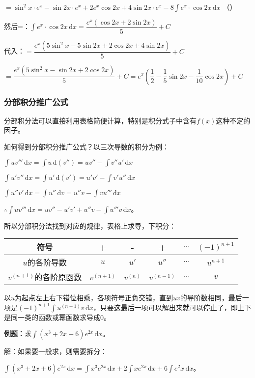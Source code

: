 \documentclass[UTF8, 12pt]{ctexart}
\begin{document}
$=\sin^2x\cdot e^x-\sin2x\cdot e^x+2e^x\cos2x+4\sin2x\cdot e^x-8\int e^x\cdot\cos2x\,\textrm{d}x$ （）

然后=：$\int e^x\cdot\cos2x\,\textrm{d}x=\dfrac{e^x(\cos2x+2\sin2x)}{5}+C$

代入：$=\dfrac{e^x(5\sin^2x-5\sin2x+2\cos2x+4\sin2x)}{5}+C$

$=\dfrac{e^x(5\sin^2x-\sin2x+2\cos2x)}{5}+C=e^x\left(\dfrac{1}{2}-\dfrac{1}{5}\sin2x-\dfrac{1}{10}\cos2x\right)+C$

\subsubsection{分部积分推广公式}

分部积分法可以直接利用表格简便计算，特别是积分式子中含有$f(x)$这种不定的因子。

如何得到分部积分推广公式？以三次导数的积分为例：

$\int uv'''\,\textrm{d}x=\int u\,\textrm{d}(v'')=uv''-\int v''u'\,\textrm{d}x$

$\int u'v''\,\textrm{d}x=\int u'\,\textrm{d}(v')=u'v'-\int v'u''\,\textrm{d}x$

$\int u''v'\,\textrm{d}x=\int u''\,\textrm{d}v=u''v-\int vu'''\,\textrm{d}x$

$\therefore\int uv'''\,\textrm{d}x=uv''-u'v'+u''v-\int u'''v\,\textrm{d}x$。

所以分部积分法找到对应的规律，表格上求导，下积分：\medskip

\begin{tabular}{|c|c|c|c|c|c|}
    \hline
    符号 & + & - & + & $\cdots$ & $(-1)^{n+1}$ \\ \hline
    $u$的各阶导数 & $u$ & $u'$ & $u''$ & $\cdots$ & $u^{n+1}$ \\ \hline
    $v^{(n+1)}$的各阶原函数 & $v^{(n+1)}$ & $v^{(n)}$ & $v^{(n-1)}$ & $\cdots$ & $v$ \\
    \hline
\end{tabular} \medskip

以$u$为起点左上右下错位相乘，各项符号正负交错，直到$uv$的导阶数相同，最后一项是$(-1)^{n+1}\int u^{(n+1)}v\,\textrm{d}x$，只要这最后一项可以解出来就可以停止了，即上下是同一类的函数或幂函数求导成0。

\textbf{例题：}求$\int(x^3+2x+6)e^{2x}\,\textrm{d}x$。

解：如果要一般求，则需要拆分：

$\int(x^3+2x+6)e^{2x}\,\textrm{d}x=\int x^3e^{2x}\,\textrm{d}x+2\int xe^{2x}\,\textrm{d}x+6\int e^2x\,\textrm{d}x$。
\end{document}

